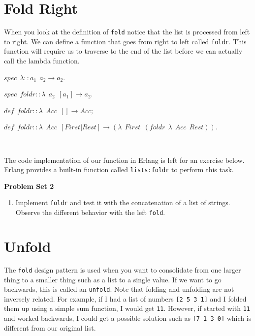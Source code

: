 \documentclass[
]{book}
\providecommand{\tightlist}{%
  \setlength{\itemsep}{0pt}\setlength{\parskip}{0pt}}
\begin{document}
\hypertarget{fold-right}{%
\section{Fold Right}\label{fold-right}}

When you look at the definition of \texttt{fold} notice that the list is processed from left to right. We can define a function that goes from right to left called \texttt{foldr}. This function will require us to traverse to the end of the list before we can actually call the lambda function.

\begin{formulabox}
\(spec ~ ~ \lambda :: a_1 ~ ~ a_2 \rightarrow a_2.\)

\(spec ~ ~ \mathit{foldr} :: \lambda ~ ~ a_2 ~ ~ [a_1]\rightarrow a_2.\)

\(de\mathit{f} ~ ~ \mathit{foldr} :: \lambda ~ ~ Acc ~ ~ [] \rightarrow Acc;\)

\(de\mathit{f} ~ ~ \mathit{foldr} :: \lambda ~ ~ Acc ~ ~ [First|Rest]\rightarrow (\lambda ~ ~ First ~ ~ (\mathit{foldr} ~ ~ \lambda ~ ~ Acc ~ ~ Rest)).\)

\end{formulabox}

\(\nonumber\)

The code implementation of our function in Erlang is left for an exercise below. Erlang provides a built-in function called \texttt{lists:foldr} to perform this task.

\begin{problembox}

\textbf{Problem Set 2}

\begin{enumerate}
\def\labelenumi{\arabic{enumi}.}
\tightlist
\item
  Implement \texttt{foldr} and test it with the concatenation of a list of strings. Observe the different behavior with the left \texttt{fold}.
\end{enumerate}

\end{problembox}

\hypertarget{unfold}{%
\section{Unfold}\label{unfold}}

The \texttt{fold} design pattern is used when you want to consolidate from one larger thing to a smaller thing such as a list to a single value. If we want to go backwards, this is called an \texttt{unfold}. Note that folding and unfolding are not inversely related. For example, if I had a list of numbers \texttt{{[}2\ 5\ 3\ 1{]}} and I folded them up using a simple sum function, I would get \texttt{11}. However, if started with \texttt{11} and worked backwards, I could get a possible solution such as \texttt{{[}7\ 1\ 3\ 0{]}} which is different from our original list.
\end{document}
